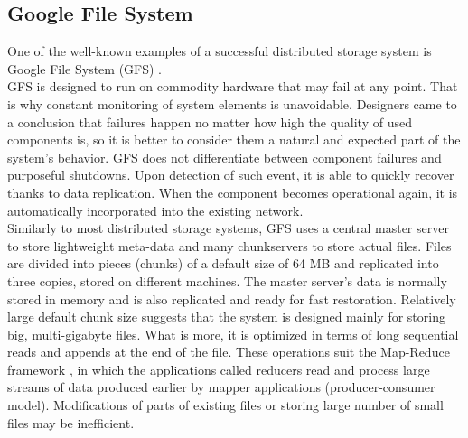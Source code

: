 \documentclass{pracamgren}
\begin{document}
\subsection{Google File System}

One of the well-known examples of a successful distributed storage system is Google File System (GFS) \cite{gfs}.\\

GFS is designed to run on commodity hardware that may fail at any point. That is why constant monitoring of system elements is unavoidable. Designers came to a conclusion that failures happen no matter how high the quality of used components is, so it is better to consider them a natural and expected part of the system's behavior. GFS does not differentiate between component failures and purposeful shutdowns. Upon detection of such event, it is able to quickly recover thanks to data replication. When the component becomes operational again, it is automatically incorporated into the existing network.\\

Similarly to most distributed storage systems, GFS uses a central master server to store lightweight meta-data and many chunkservers to store actual files. Files are divided into pieces (chunks) of a default size of 64 MB and replicated into three copies, stored on different machines. The master server's data is normally stored in memory and is also replicated and ready for fast restoration. Relatively large default chunk size suggests that the system is designed mainly for storing big, multi-gigabyte files. What is more, it is optimized in terms of long sequential reads and appends at the end of the file. These operations suit the Map-Reduce framework \cite{mapreduce}, in which the applications called reducers read and process large streams of data produced earlier by mapper applications (producer-consumer model). Modifications of parts of existing files or storing large number of small files may be inefficient.\\
\end{document}
